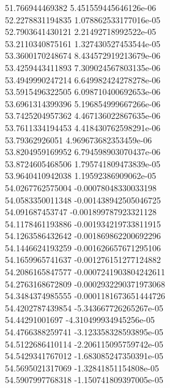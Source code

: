 {51.766944469382 5.451559445646126e-06 \\
52.2278831194835 1.078862533177016e-05 \\
52.7903641430121 2.21492718992522e-05 \\
53.2110340875161 1.327430527453544e-05 \\
53.3600170248674 8.434572919213679e-06 \\
53.4259443411893 7.309024567803135e-06 \\
53.4949990247214 6.649982424278278e-06 \\
53.5915496322505 6.098710400692653e-06 \\
53.6961314399396 5.196854999667266e-06 \\
53.7425204957362 4.467136022867635e-06 \\
53.7611334194453 4.418430762598291e-06 \\
53.79362926051 4.969673682353459e-06 \\
53.8204959169952 6.794598903070437e-06 \\
53.8724605468506 1.795741809473839e-05 \\
53.9640410942038 1.19592386909062e-05 \\
54.0267762575004 -0.00078048330033198 \\
54.0583350011348 -0.001438942505046725 \\
54.091687453747 -0.001899787923321128 \\
54.1178461193886 -0.001934219733811915 \\
54.1263586432642 -0.001869862200692296 \\
54.1446624193259 -0.001626657671295106 \\
54.1659965741637 -0.001276151277124882 \\
54.2086165847577 -0.0007241903804242611 \\
54.2763168672809 -0.0002932290371973068 \\
54.3484374985555 -0.0001181673651444726 \\
54.4202787439854 -5.343667726265267e-05 \\
54.44291001697 -4.310499934945256e-05 \\
54.4766388259741 -3.123358328593895e-05 \\
54.5122686410114 -2.206115095759742e-05 \\
54.5429341767012 -1.683085247350391e-05 \\
54.5695021317069 -1.32841851154808e-05 \\
54.5907997768318 -1.150741809397005e-05 \\
}
